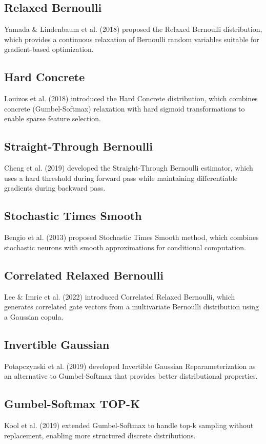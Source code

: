 \documentclass[peerreview]{IEEEtran}
\begin{document}
\subsection{Relaxed Bernoulli}
Yamada \& Lindenbaum et al. (2018) proposed the Relaxed Bernoulli distribution, which provides a continuous relaxation of Bernoulli random variables suitable for gradient-based optimization.

\subsection{Hard Concrete}
Louizos et al. (2018) introduced the Hard Concrete distribution, which combines concrete (Gumbel-Softmax) relaxation with hard sigmoid transformations to enable sparse feature selection.

\subsection{Straight-Through Bernoulli}
Cheng et al. (2019) developed the Straight-Through Bernoulli estimator, which uses a hard threshold during forward pass while maintaining differentiable gradients during backward pass.

\subsection{Stochastic Times Smooth}
Bengio et al. (2013) proposed Stochastic Times Smooth method, which combines stochastic neurons with smooth approximations for conditional computation.

\subsection{Correlated Relaxed Bernoulli}
Lee \& Imrie et al. (2022) introduced Correlated Relaxed Bernoulli, which generates correlated gate vectors from a multivariate Bernoulli distribution using a Gaussian copula.

\subsection{Invertible Gaussian}
Potapczynski et al. (2019) developed Invertible Gaussian Reparameterization as an alternative to Gumbel-Softmax that provides better distributional properties.

\subsection{Gumbel-Softmax TOP-K}
Kool et al. (2019) extended Gumbel-Softmax to handle top-k sampling without replacement, enabling more structured discrete distributions.
\end{document}
